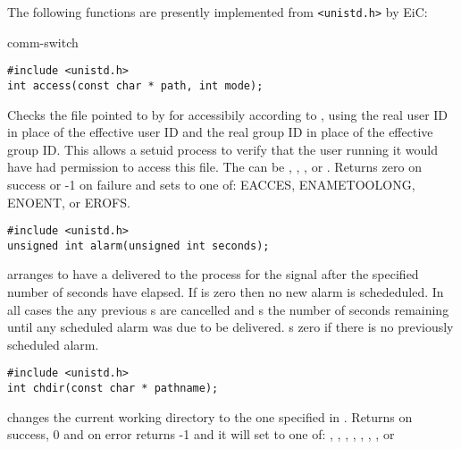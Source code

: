 The following functions are presently implemented from
\verb+<unistd.h>+ by EiC:

\begin{Ventry2}{comm-switch  }

\item[access]
\label{item:access}
\begin{production}
\begin{verbatim}
#include <unistd.h>
int access(const char * path, int mode);
\end{verbatim}
\end{production}


   Checks the file pointed to by  for accessibily according to
   , using the real user ID in place of the effective user ID
   and the real group ID in place of the effective group ID. This
   allows a setuid process to verify that the user running it would
   have had permission to access this file.  The  can be
   , , , or . Returns zero on
success or -1 on failure and sets  to one of:
     EACCES, ENAMETOOLONG, ENOENT, or EROFS.


\item[alarm]
\label{item:alarm}
\begin{production}
\begin{verbatim}
#include <unistd.h>
unsigned int alarm(unsigned int seconds);
\end{verbatim}
\end{production}


 arranges to have a  delivered to the process for the signal
 after the specified number of seconds have elapsed. If  is zero
then no new alarm is schededuled. In all cases the any previous s are cancelled and
s the number of seconds remaining  until  any  scheduled alarm was due to be delivered.
s zero if there is no previously scheduled alarm. 


\item[chdir]
\label{item:chdir}
\begin{production}
\begin{verbatim}
#include <unistd.h>
int chdir(const char * pathname);
\end{verbatim}
\end{production}

 changes the current working directory to the one specified in .
Returns on success, 0 and on error returns -1 and it will set  to one of:  
 , , , , , , ,  or 


\end{Ventry2}
